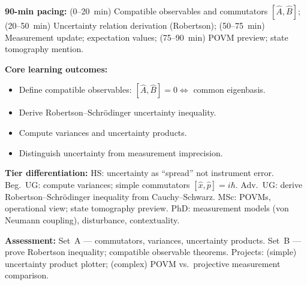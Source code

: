 \documentclass[11pt,a4paper]{article}
\begin{document}
\medskip
\begin{tcolorbox}[modulebox, title={Module~I.2 --- Lecture L07: Measurement Theory: Postulates, Compatibility \& Uncertainty}]
\textbf{90-min pacing:} (0--20~min) Compatible observables and commutators $[\hat{A},\hat{B}]$;
(20--50~min) Uncertainty relation derivation (Robertson);
(50--75~min) Measurement update; expectation values;
(75--90~min) POVM preview; state tomography mention.

\medskip\textbf{Core learning outcomes:}
\begin{itemize}[leftmargin=1.4em,topsep=2pt,itemsep=1pt]
  \item Define compatible observables: $[\hat{A},\hat{B}]=0 \Leftrightarrow$ common eigenbasis.
  \item Derive Robertson--Schr\"odinger uncertainty inequality.
  \item Compute variances and uncertainty products.
  \item Distinguish uncertainty from measurement imprecision.
\end{itemize}

\medskip\textbf{Tier differentiation:}
HS: uncertainty as ``spread'' not instrument error.
Beg.\ UG: compute variances; simple commutators $[\hat{x},\hat{p}]=i\hbar$.
Adv.\ UG: derive Robertson--Schr\"odinger inequality from Cauchy--Schwarz.
MSc: POVMs, operational view; state tomography preview.
PhD: measurement models (von Neumann coupling), disturbance, contextuality.

\medskip\textbf{Assessment:}
Set~A --- commutators, variances, uncertainty products.
Set~B --- prove Robertson inequality; compatible observable theorems.
Projects: (simple) uncertainty product plotter; (complex) POVM vs.\ projective measurement comparison.
\end{tcolorbox}
\end{document}
